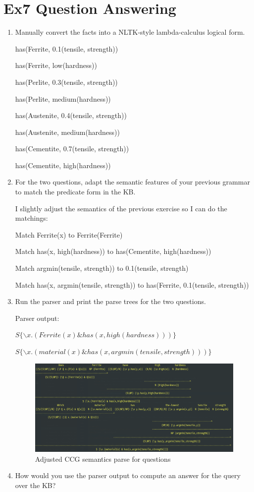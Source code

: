\documentclass[12pt]{article}
\begin{document}
{\newpage
\section{Ex7 Question Answering}
\label{sec: ex7}
\begin{enumerate}[1.]
    \item Manually convert the facts into a NLTK-style lambda-calculus logical form.
    
    has(Ferrite, 0.1(tensile, strength))

    has(Ferrite, low(hardness))

    has(Perlite, 0.3(tensile, strength))

    has(Perlite, medium(hardness))

    has(Austenite, 0.4(tensile, strength))

    has(Austenite, medium(hardness))

    has(Cementite, 0.7(tensile, strength))

    has(Cementite, high(hardness))
    \item For the two questions, adapt the semantic features of your previous grammar to match the predicate form in the KB.
    
    I slightly adjust the semantics of the previous exercise so I can do the matchings:

    Match Ferrite(x) to Ferrite(Ferrite)

    Match has(x, high(hardness)) to has(Cementite, high(hardness))
    
    Match argmin(tensile, strength)) to 0.1(tensile, strength)
    
    Match has(x, argmin(tensile, strength)) to has(Ferrite, 0.1(tensile, strength))
    \item Run the parser and print the parse trees for the two questions.
    
    Parser output:

    $S \{\backslash x.(Ferrite(x) \& has(x,high(hardness)))\}$

    $S \{\backslash x.(material(x) \& has(x,argmin(tensile,strength)))\}$

    \begin{figure}[ht]
        \centering
        \includegraphics[scale=0.25]{figs/adjusted-semantics.png}
        \caption{Adjusted CCG semantics parse for questions}
        \label{label:adjusted parser}
    \end{figure}
    \item How would you use the parser output to compute an answer for the query over the KB?
    

\end{enumerate}}
\end{document}
